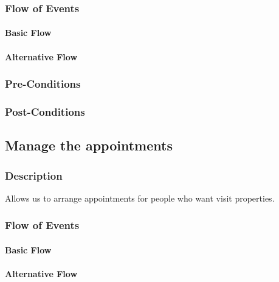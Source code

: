 \documentclass[a4paper,12pt]{article}
\begin{document}
\subsubsection{Flow of Events}
\paragraph{Basic Flow}
\begin{itemize}
\end{itemize}

\paragraph{Alternative Flow}
\begin{itemize}
\end{itemize}

\subsubsection{Pre-Conditions}
\subsubsection{Post-Conditions}

\subsection{Manage the appointments}
\subsubsection{Description}
Allows us to arrange appointments for people who want visit properties.
\subsubsection{Flow of Events}
\paragraph{Basic Flow}
\begin{itemize}
\end{itemize}

\paragraph{Alternative Flow}
\begin{itemize}
\end{itemize}
\end{document}
